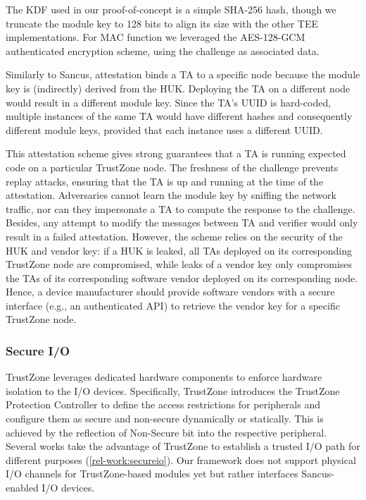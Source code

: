 The \ac{KDF} used in our proof-of-concept is a simple SHA-256 hash, though we
truncate the module key to 128 bits to align its size with the other \ac{TEE}
implementations. For \ac{MAC} function we leveraged the AES-128-GCM
authenticated encryption scheme, using the challenge as associated data.

Similarly to Sancus, attestation binds a TA to a specific node because the
module key is (indirectly) derived from the \ac{HUK}.
Deploying the TA on
a different node would result in a different module key. Since the TA's
UUID is hard-coded, multiple instances of the same TA would have different
hashes and consequently different module keys, provided that each instance uses
a different UUID.

This attestation scheme gives strong guarantees that a TA is running expected
code on a particular TrustZone node. The freshness of the challenge prevents
replay attacks, ensuring that the TA is up and running at the time of the
attestation. Adversaries cannot learn the module key by sniffing the network
traffic, nor can they impersonate a TA to compute the response to the challenge.
Besides, any attempt to modify the messages between TA and verifier would only
result in a failed attestation. However, the scheme relies on the security of
the \ac{HUK} and vendor key: if a \ac{HUK} is leaked, all TAs deployed on its
corresponding TrustZone node are compromised, while leaks of a vendor key
only compromises the TAs of its corresponding software vendor deployed on
its corresponding node. Hence, a device manufacturer should provide
software vendors with a secure interface (e.g., an authenticated API) to
retrieve the vendor key for a specific TrustZone node.

\subsubsection{Secure I/O}
%
TrustZone leverages dedicated hardware components to enforce hardware isolation
to the I/O devices.  Specifically, TrustZone introduces the TrustZone Protection
Controller to define the access restrictions for peripherals and configure them
as secure and non-secure dynamically or statically. This is achieved by the
reflection of Non-Secure bit into the respective peripheral. Several works take
the advantage of TrustZone to establish a trusted I/O path for different
purposes \cite{TrustUI, ProtectedConfirmation, TrustOTP, TrustPay}
(\cref{rel-work:secureio}). Our framework does not support physical I/O
channels for TrustZone-based modules yet but rather interfaces Sancus-enabled
I/O devices.


